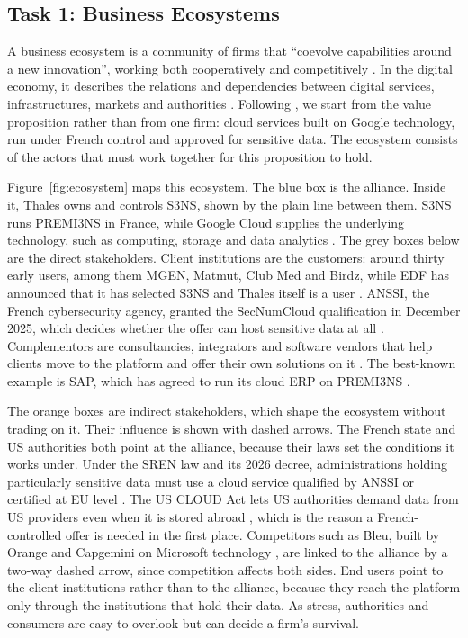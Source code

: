 \subsection{Task 1: Business Ecosystems}
\label{sec:task1}

A business ecosystem is a community of firms that ``coevolve capabilities
around a new innovation'', working both cooperatively and competitively
\parencite[p.~46]{overby2021}. In the digital economy, it describes the
relations and dependencies between digital services, infrastructures, markets
and authorities \parencite[p.~48]{overby2021}. Following \textcite{adner2017},
we start from the value proposition rather than from one firm: cloud services
built on Google technology, run under French control and approved for
sensitive data. The ecosystem consists of the actors that must work together
for this proposition to hold.

Figure~\ref{fig:ecosystem} maps this ecosystem. The blue box is the alliance.
Inside it, Thales owns and controls S3NS, shown by the plain line between them.
S3NS runs PREMI3NS in France, while Google Cloud supplies the underlying
technology, such as computing, storage and data analytics
\parencite{s3ns2025premi3ns}. The grey boxes below are the direct stakeholders.
Client institutions are the customers: around thirty early users, among them
MGEN, Matmut, Club Med and Birdz, while EDF has announced that it has selected
S3NS and Thales itself is a user \parencite{s3ns2025premi3ns}. ANSSI, the
French cybersecurity agency, granted the SecNumCloud qualification in December
2025, which decides whether the offer can host sensitive data at all
\parencite{s3ns2025premi3ns}. Complementors are consultancies, integrators and
software vendors that help clients move to the platform and offer their own
solutions on it \parencite{s3nsecosystem}. The best-known example is SAP, which
has agreed to run its cloud ERP on PREMI3NS \parencite{thalessap2026}.

The orange boxes are indirect stakeholders, which shape the ecosystem without
trading on it. Their influence is shown with dashed arrows. The French state and
US authorities both point at the alliance, because their laws set the
conditions it works under. Under the SREN law and its 2026 decree,
administrations holding particularly sensitive data must use a cloud service
qualified by ANSSI or certified at EU level \parencite{decretsren2026}. The US
CLOUD Act lets US authorities demand data from US providers even when it is
stored abroad \parencite{doj2019cloudact}, which is the reason a
French-controlled offer is needed in the first place. Competitors such as Bleu,
built by Orange and Capgemini on Microsoft technology \parencite{lemagit2023usf},
are linked to the alliance by a two-way dashed arrow, since competition affects
both sides. End users point to the client institutions rather than to the
alliance, because they reach the platform only through the institutions that
hold their data. As \textcite[p.~58]{overby2021} stress, authorities and
consumers are easy to overlook but can decide a firm's survival.


